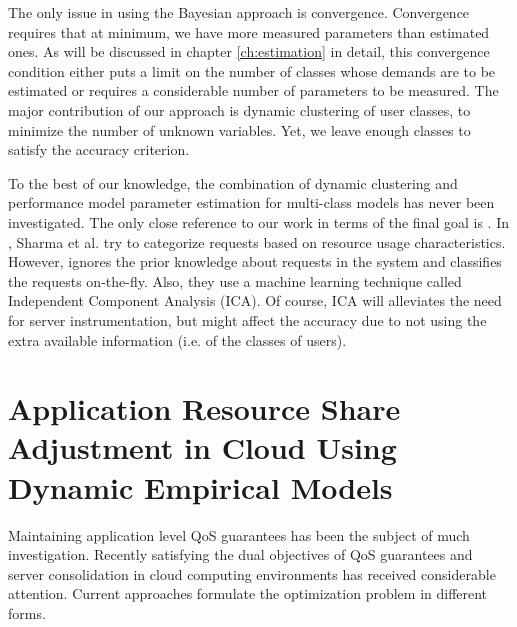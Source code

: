         The only issue in using the Bayesian approach is convergence. Convergence requires that at minimum, we have more measured parameters than estimated ones. As will be discussed in chapter \ref{ch:estimation} in detail, this convergence condition either puts a limit on the number of classes whose demands are to be estimated or requires a considerable number of parameters to be measured. The major contribution of our approach is dynamic clustering of user classes, to minimize the number of unknown variables. Yet, we leave enough classes to satisfy the accuracy criterion.  

  To the best of our knowledge, the combination of dynamic clustering and performance model parameter estimation for multi-class models has never been investigated. The only close reference to our work in terms of the final goal is \cite{sharma_automatic_2008}. 
In \cite{sharma_automatic_2008}, Sharma et al. try to categorize requests based on resource usage characteristics. However, \cite{sharma_automatic_2008} ignores the prior knowledge about requests in the system and classifies the requests on-the-fly. Also, they use a machine learning technique called Independent Component Analysis (ICA). Of course, ICA will alleviates the need for server instrumentation, but might affect the accuracy due to not using the extra available information (i.e. of the classes of users).


\section{Application Resource Share Adjustment in Cloud Using Dynamic Empirical Models}      
\label{sec:application_resource_share_optimization_private_cloud}

Maintaining application level QoS guarantees has been the subject of much investigation. Recently satisfying the dual objectives of QoS guarantees and server consolidation in cloud computing environments has received considerable attention. Current approaches formulate the optimization problem in different forms.

